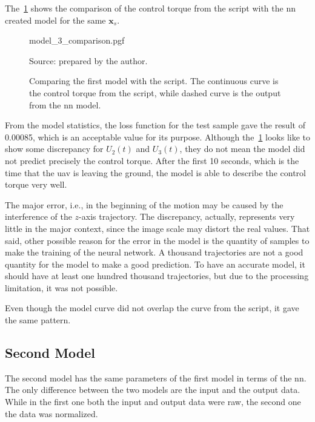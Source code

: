The~\cref{fig:model_3_comparison} shows the comparison of the control torque from the script with the \gls*{nn} created model for the same \(\symbf{x}_s\).
%
\begin{figure}[!htb]
    \centering
    \caption[Comparing the first model with the script]{Comparing the first model with the script. The continuous curve is the control torque from the script, while dashed curve is the output from the \gls*{nn} model.}
    {model_3_comparison.pgf}

    {\footnotesize Source: prepared by the author.}
    \label{fig:model_3_comparison}
\end{figure}

From the model statistics, the loss function for the test sample gave the result of 0.00085, which is an acceptable value for its purpose.
Although the~\cref{fig:model_3_comparison} looks like to show some discrepancy for \(U_2(t)\) and \(U_3(t)\), they do not mean the model did not predict precisely the control torque. 
After the first 10 seconds, which is the time that the \gls*{uav} is leaving the ground, the model is able to describe the control torque very well.

The major error, i.e., in the beginning of the motion may be caused by the interference of the \(z\)-axis trajectory. 
The discrepancy, actually, represents very little in the major context, since the image scale may distort the real values.
That said, other possible reason for the error in the model is the quantity of samples to make the training of the neural network. 
A thousand trajectories are not a good quantity for the model to make a good prediction.
To have an accurate model, it should have at least one hundred thousand trajectories, but due to the processing limitation, it was not possible.

Even though the model curve did not overlap the curve from the script, it gave the same pattern.

\subsection{Second Model}

The second model has the same parameters of the first model in terms of the \gls*{nn}.
The only difference between the two models are the input and the output data.
While in the first one both the input and output data were raw, the second one the data was normalized.

